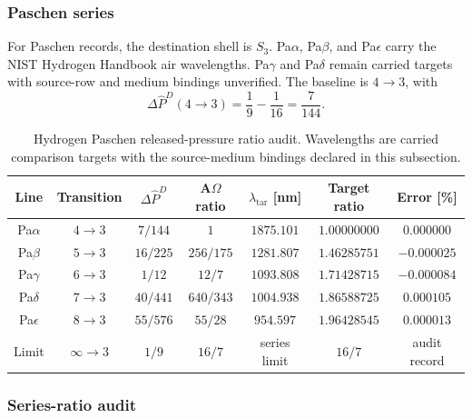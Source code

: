 \subsubsection{Paschen series}\label{manual:hydrogen:paschen}
For Paschen records, the destination shell is \(S_3\). Pa\(\alpha\), Pa\(\beta\), and Pa\(\epsilon\) carry the NIST Hydrogen Handbook air wavelengths. Pa\(\gamma\) and Pa\(\delta\) remain carried targets with source-row and medium bindings unverified. The baseline is \(4\to3\), with
\[
\Delta\widehat P^D(4\to3)=\frac19-\frac1{16}=\frac7{144}.
\]

\begin{table}[h]
\centering
\scriptsize
\caption{Hydrogen Paschen released-pressure ratio audit. Wavelengths are carried comparison targets with the source-medium bindings declared in this subsection.}
\begin{tabular}{c c c c c c c}
\toprule
Line & Transition & $\Delta\widehat P^D$ & A\(\Omega\) ratio & $\lambda_{\mathrm{tar}}$ [nm] & Target ratio & Error [\%]\\
\midrule
Pa$\alpha$ & $4\to3$ & $7/144$ & $1$ & $1875.101$ & $1.00000000$ & $0.000000$\\
Pa$\beta$ & $5\to3$ & $16/225$ & $256/175$ & $1281.807$ & $1.46285751$ & $-0.000025$\\
Pa$\gamma$ & $6\to3$ & $1/12$ & $12/7$ & $1093.808$ & $1.71428715$ & $-0.000084$\\
Pa$\delta$ & $7\to3$ & $40/441$ & $640/343$ & $1004.938$ & $1.86588725$ & $0.000105$\\
Pa$\epsilon$ & $8\to3$ & $55/576$ & $55/28$ & $954.597$ & $1.96428545$ & $0.000013$\\
Limit & $\infty\to3$ & $1/9$ & $16/7$ & series limit & $16/7$ & audit record\\
\bottomrule
\end{tabular}
\label{tab:manual-hydrogen-paschen-ratios}
\end{table}

\subsubsection{Series-ratio audit}\label{manual:hydrogen:series-audit}


